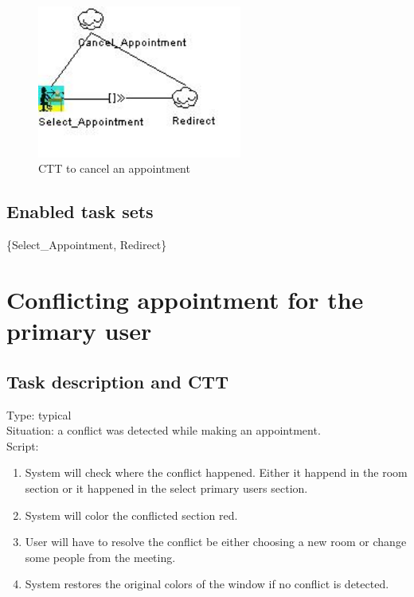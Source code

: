 \documentclass[11pt, a4paper,svglistings]{report}
\begin{document}
\begin{figure}[H]
\centering
    \includegraphics[width=0.6\textwidth]{CancelAppointment.jpg}
  \caption[Cancel appointment CTT]{\label{fig:CancelAppointment}CTT to cancel an appointment}
\end{figure}

\subsection{Enabled task sets}

\{Select\_Appointment, Redirect\}


\section{Conflicting appointment for the primary user}

\subsection{Task description and CTT}

\label{subsec:conflictPrimary}Type: typical \\
Situation: a conflict was detected while making an appointment. \\
Script:
\begin{enumerate}
\item System will check where the conflict happened. Either it happend in the room section or it happened in the select primary users section.
\item System will color the conflicted section red.
\item User will have to resolve the conflict be either choosing a new room or change some people from the meeting.
\item System restores the original colors of the window if no conflict is detected.
\end{enumerate}
\end{document}
